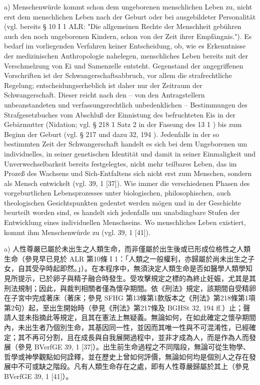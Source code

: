 \documentclass[12pt]{article}
\begin{document}
\begin{sourcepara}[title={原文D.37}]
a) Menschenwürde kommt schon dem ungeborenen menschlichen Leben zu, nicht erst dem menschlichen Leben nach der Geburt oder bei ausgebildeter Personalität (vgl. bereits § 10 I 1 ALR: "Die allgemeinen Rechte der Menschheit gebühren auch den noch ungeborenen Kindern, schon von der Zeit ihrer Empfängnis."). Es bedarf im vorliegenden Verfahren keiner Entscheidung, ob, wie es Erkenntnisse der medizinischen Anthropologie nahelegen, menschliches Leben bereits mit der Verschmelzung von Ei und Samenzelle entsteht. Gegenstand der angegriffenen Vorschriften ist der Schwangerschaftsabbruch, vor allem die strafrechtliche Regelung; entscheidungserheblich ist daher nur der Zeitraum der Schwangerschaft. Dieser reicht nach den -- von den Antragstellern unbeanstandeten und verfassungsrechtlich unbedenklichen -- Bestimmungen des Strafgesetzbuches vom Abschluß der Einnistung des befruchteten Eis in der Gebärmutter (Nidation; vgl. § 218 \abbrAbs{} 1 Satz 2 \abbrStGB{} in der Fassung des \abbrArt{} 13 \abbrNr{} 1 \abbrSFHG{}) bis zum Beginn der Geburt (vgl. § 217 \abbrStGB{} und dazu \abbrBGHSt{} 32, 194 \abbrFF{}). Jedenfalls in der so bestimmten Zeit der Schwangerschaft handelt es sich bei dem Ungeborenen um individuelles, in seiner genetischen Identität und damit in seiner Einmaligkeit und Unverwechselbarkeit bereits festgelegtes, nicht mehr teilbares Leben, das im Prozeß des Wachsens und Sich-Entfaltens sich nicht erst zum Menschen, sondern als Mensch entwickelt (vgl. \abbrBVerfGE{} 39, 1 [37]). Wie immer die verschiedenen Phasen des vorgeburtlichen Lebensprozesses unter biologischen, philosophischen, auch theologischen Gesichtspunkten gedeutet werden mögen und in der Geschichte beurteilt worden sind, es handelt sich jedenfalls um unabdingbare Stufen der Entwicklung eines individuellen Menschseins. Wo menschliches Leben existiert, kommt ihm Menschenwürde zu (vgl. \abbrBVerfGE{} 39, 1 [41]).
\end{sourcepara}
\begin{transpara}
a) 人性尊嚴已屬於未出生之人類生命，而非僅屬於出生後或已形成位格性之人類生命（參見早已見於 ALR 第10條 I 1：「人類之一般權利，亦歸屬於尚未出生之子女，自其受孕時起即然。」）。在本程序中，無須決定人類生命是否如醫學人類學知見所提示，已於卵子與精子融合時發生。受攻擊規定之標的為終止妊娠，尤其是其刑法規制；因此，與裁判相關者僅為懷孕期間。依《刑法》規定，該期間自受精卵在子宮中完成著床（著床；參見 SFHG 第13條第1款版本之《刑法》第218條第1項第2句）起，至出生開始時（參見《刑法》第217條及 BGHSt 32, 194 ff.）止；聲請人並未指摘此等規定，且其在憲法上無疑義。無論如何，在如此確定之懷孕期間內，未出生者乃個別生命，其基因同一性，並因而其唯一性與不可混淆性，已經確定；其不再可分割，且在成長與自我展開過程中，並非才成為人，而是作為人而發展（參見 BVerfGE 39, 1 [37]）。出生前生命過程之不同階段，無論可從生物學、哲學或神學觀點如何詮釋，並在歷史上曾如何評價，無論如何均是個別人之存在發展中不可或缺之階段。凡有人類生命存在之處，即有人性尊嚴歸屬於其上（參見 BVerfGE 39, 1 [41]）。
\end{transpara}
\end{document}
